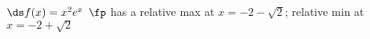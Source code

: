 {$\ds f(x) = x^2e^x$
}
{$\fp$ has a relative max at $x=-2-\sqrt{2}$;
relative min at $x=-2+\sqrt{2}$
}

